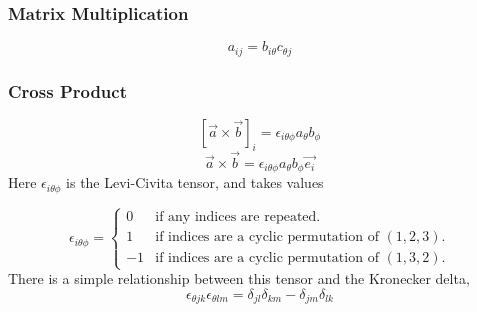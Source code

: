 \subsubsection{Matrix Multiplication}
\label{sec:matrixmult}

\begin{equation}
  \label{eq:matmult}
  a_{ij} = b_{i \theta} c_{\theta j}
\end{equation}

\subsubsection{Cross Product}
\label{sec:crossprod}

\begin{equation}
  \label{eq:crossprod1}
  [ \vec a \times \vec b]_i = \epsilon_{i \theta \phi} a_{\theta} b_{\phi}
\end{equation}
\begin{equation}
  \label{eq:crossprod2}
  \vec{a} \times \vec{b} = \epsilon_{i \theta \phi} a_{\theta} b_{\phi} \vec{e_{i}}
\end{equation}
Here $\epsilon_{i \theta \phi}$ is the Levi-Civita tensor, and takes
values

\begin{equation}
  \label{eq:levitcivita}
  \epsilon_{i \theta \phi} = \left\{ 
    \begin{array}{rl}
      0 & \text{if any indices are repeated.} \\
      1 & \text{if indices are a cyclic permutation of } (1,2,3). \\
      -1 & \text{if indices are a cyclic permutation of } (1,3,2). 
    \end{array}\right.
\end{equation}
There is a simple relationship between this tensor and the Kronecker
delta,
\begin{equation}
  \label{eq:deltalevi}
  \epsilon_{\theta j k } \epsilon_{\theta l m} = \delta_{jl} \delta_{k m} - \delta_{j m} \delta_{l k}
\end{equation}

